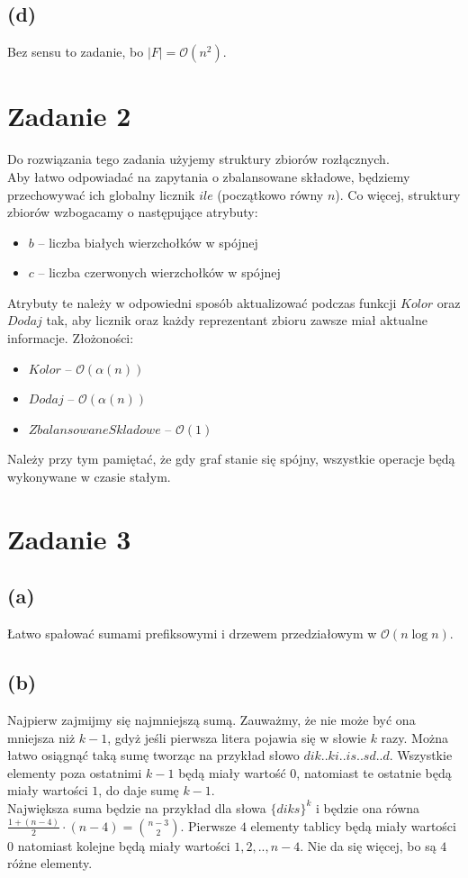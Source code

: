 \documentclass[12pt, a4paper]{article}
\newcommand{\MCALO}{\mathcal{O}}
\begin{document}
\subsection*{(d)}
Bez sensu to zadanie, bo $|F| = \MCALO(n^2)$.

\newpage
\section*{Zadanie 2}
Do rozwiązania tego zadania użyjemy struktury zbiorów rozłącznych.\\ Aby łatwo
odpowiadać na zapytania o zbalansowane składowe, będziemy przechowywać ich
globalny licznik $ile$ (początkowo równy $n$). Co więcej, struktury zbiorów
wzbogacamy o następujące atrybuty:
\begin{itemize}
  \item $\mathit{b}$ -- liczba białych wierzchołków w spójnej
  \item $\mathit{c}$ -- liczba czerwonych wierzchołków w spójnej
\end{itemize}
Atrybuty te należy w odpowiedni sposób aktualizować podczas funkcji
$\mathit{Kolor}$ oraz $\mathit{Dodaj}$ tak, aby licznik oraz każdy reprezentant
zbioru zawsze miał aktualne informacje. Złożoności: 
\begin{itemize}
  \item $\mathit{Kolor}$ -- $\MCALO(\alpha(n))$
  \item $\mathit{Dodaj}$ -- $\MCALO(\alpha(n))$
  \item $\mathit{ZbalansowaneSkladowe}$ -- $\MCALO(1)$
\end{itemize}
Należy przy tym pamiętać, że gdy graf stanie się spójny, wszystkie operacje
będą wykonywane w czasie stałym.

\section*{Zadanie 3}
\subsection*{(a)}
Łatwo spałować sumami prefiksowymi i drzewem przedziałowym
w $\MCALO(n\log{n})$.

\subsection*{{(b)}}
Najpierw zajmijmy się najmniejszą sumą. Zauważmy, że nie może być ona mniejsza
niż $k-1$, gdyż jeśli pierwsza litera pojawia się w słowie $k$ razy. Można
łatwo osiągnąć taką sumę tworząc na przykład słowo $dik..ki..is..sd..d$.
Wszystkie elementy poza ostatnimi $k-1$ będą miały wartość $0$, natomiast te
ostatnie będą miały wartości $1$, do daje sumę $k-1$.\\ Największa suma będzie
na przykład dla słowa $\{diks\}^{k}$ i będzie ona równa $\frac{1 + (n-4)}{2}
\cdot (n-4) = \binom{n-3}{2}$. Pierwsze $4$ elementy tablicy będą miały
wartości $0$ natomiast kolejne będą miały wartości $1,2,..,n-4$. Nie da się więcej, bo
są $4$ różne elementy.
\end{document}
